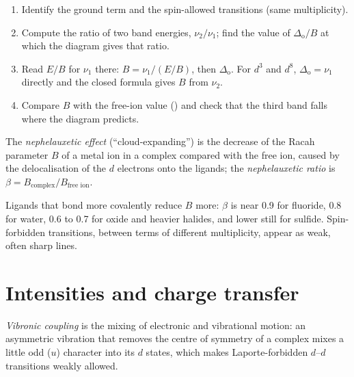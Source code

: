 \begin{method}\label{met:b3:complex-spectra-magnetism:read-ts}
\begin{enumerate}
  \item Identify the ground term and the spin-allowed transitions (same
        multiplicity).
  \item Compute the ratio of two band energies, $\nu_2/\nu_1$; find the value of $\Delta_{\mathrm o}/B$ at
        which the diagram gives that ratio.
  \item Read $E/B$ for $\nu_1$ there: $B = \nu_1/(E/B)$, then $\Delta_{\mathrm o}$. For $d^3$ and $d^8$, $\Delta_{\mathrm o} = \nu_1$
        directly and the closed formula gives $B$ from $\nu_2$.
  \item Compare $B$ with the free-ion value () and check that the
        third band falls where the diagram predicts.
\end{enumerate}
\end{method}

\begin{definition}\label{def:b3:complex-spectra-magnetism:nephelauxetic}
The \emph{nephelauxetic effect} (``cloud-expanding'') is
the decrease of the Racah parameter $B$ of a metal ion in a complex compared with
the free ion, caused by the delocalisation of the $d$ electrons onto the
ligands; the \emph{nephelauxetic ratio} is $\beta =
B_{\text{complex}}/B_{\text{free ion}}$.
\end{definition}

Ligands that bond more covalently reduce $B$ more: $\beta$ is near 0.9 for fluoride, 0.8
for water, 0.6 to 0.7 for oxide and heavier halides, and lower still for sulfide.
Spin-forbidden transitions, between terms of different multiplicity, appear
as weak, often sharp lines.

\section{Intensities and charge transfer}

\begin{definition}\label{def:b3:complex-spectra-magnetism:vibronic-coupling}
\emph{Vibronic coupling} is the mixing of electronic and
vibrational motion: an asymmetric vibration that removes the centre of
symmetry of a complex mixes a little odd ($u$) character into its $d$ states,
which makes Laporte-forbidden $d$--$d$ transitions weakly allowed.
\end{definition}

